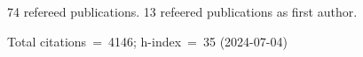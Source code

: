74 refereed publications. 13 refeered publications as first author.

Total citations~=~4146; h-index~=~35 (2024-07-04)